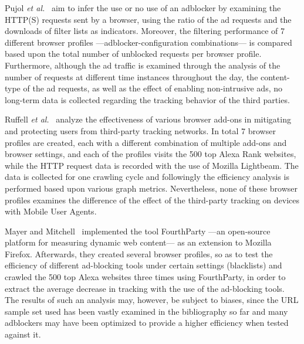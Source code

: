 Pujol \textit{et al.}~\cite{pujol} aim to infer the use or no use of an adblocker by examining the HTTP(S) requests sent by a browser, using the ratio of the ad requests and the downloads of filter lists as indicators. Moreover, the filtering performance of 7 different browser profiles ---adblocker-configuration combinations--- is compared based upon the total number of unblocked requests per browser profile. Furthermore, although the ad traffic is examined through the analysis of the number of requests at different time instances throughout the day, the content-type of the ad requests, as well as the effect of enabling non-intrusive ads, no long-term data is collected regarding the tracking behavior of the third parties.

Ruffell \textit{et al.}~\cite{ruffel2015} analyze the effectiveness of various browser add-ons in mitigating and protecting users from third-party tracking networks. In total 7 browser profiles are created, each with a different combination of multiple add-ons and browser settings, and each of the profiles visits the 500 top Alexa Rank websites, while the HTTP request data is recorded with the use of Mozilla Lightbeam. The data is collected for one crawling cycle and followingly the efficiency analysis is performed based upon various graph metrics. Nevertheless, none of these browser profiles examines the difference of the effect of the third-party tracking on devices with Mobile User Agents.

Mayer and Mitchell~\cite{mayer} implemented the tool FourthParty ---an open-source platform for measuring dynamic web content--- as an extension to Mozilla Firefox. Afterwards, they created several browser profiles, so as to test the efficiency of different ad-blocking tools under certain settings (blacklists) and crawled the 500 top Alexa websites three times using FourthParty, in order to extract the average decrease in tracking with the use of the ad-blocking tools. The results of such an analysis may, however, be subject to biases, since the URL sample set used has been vastly examined in the bibliography so far and many adblockers may have been optimized to provide a higher efficiency when tested against it.

